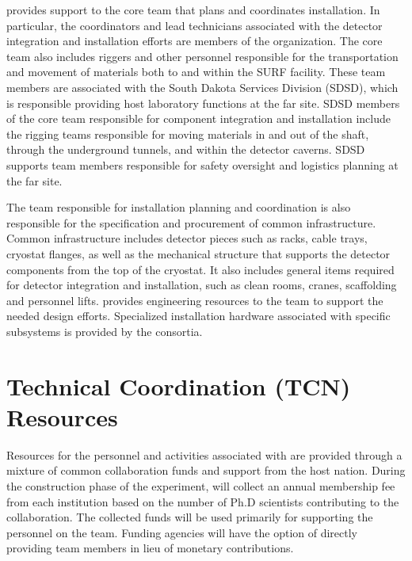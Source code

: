   provides support to the core  team that plans and coordinates installation. 
In
particular, the coordinators and lead technicians associated with the
detector integration and installation efforts are members of the
 organization.  The core team also includes
riggers and other personnel responsible for the transportation and
movement of materials both to and within the SURF facility.  These
team members are associated with the South Dakota Services Division
(SDSD), which is responsible providing host laboratory functions at
the far site.  SDSD members of the  core team responsible for
component integration and installation include the rigging teams
responsible for moving materials in and out of the shaft, through the
underground tunnels, and within the detector caverns.  SDSD 
supports team members responsible for safety oversight and logistics
planning at the far site.


The  team responsible for installation planning and coordination is
also responsible for the specification and procurement of
common infrastructure.  Common infrastructure includes detector pieces
such as racks, cable trays, cryostat flanges, as well as the
mechanical structure that supports the detector components from the
top of the cryostat.  It also includes general items required for
detector integration and installation, such as clean rooms, cranes,
scaffolding and personnel lifts.  
provides engineering resources to the  team to support the needed
design efforts. Specialized installation hardware associated with
specific subsystems is provided by the consortia.

\section{Technical Coordination (TCN) Resources}
\label{sec:tc_resources}

Resources for the personnel and activities associated with 
are provided through a mixture of common collaboration funds and
support from the host nation.  During the construction phase of the
experiment,  will collect an annual membership fee from
each institution based on the number of Ph.D scientists %
contributing to the
collaboration.  The collected funds will be used primarily for
supporting the personnel %
on the  team.  Funding
agencies will have the option of directly providing team members in
lieu of %
monetary contributions.

